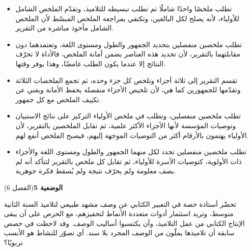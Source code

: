 \documentclass[11pt,a4paper]{article}
\begin{document}
\begin{itemize}[leftmargin=1.0cm, labelsep=6pt, itemsep=3pt, topsep=4pt, parsep=0pt]
  \item[\textbf{أ)}] تطلب ملخصًا واحدًا شاملًا ثم تطلب تبسيطه للتلاميذ، وتقدّم الملخص الشامل للأولياء، لأنه يصلح لكل البالغين، وتكتفي بمراجعة الملخص المبسّط لأن الملخص الشامل مأخوذ مباشرة من التقرير.
  \item[\textbf{ب)}] تطلب ملخصين منفصلين بتحديد الجمهور والطول ومستوى اللغة، وتعتمدهما دون مقابلتهما بالتقرير، لأن تحديد هذه العناصر يضمن أمانة الملخص، فالأداة لا تحرّف النتائج إلا عندما يكون الطلب غامضًا، وهذا يوفر وقتها.
  \item[\textbf{ج)}] تقسم التقرير إلى ثلاثة أجزاء وتلخص كل جزء وحده، ثم تجمع الملخصات الثلاثة وتقدّمها للجمهورين كما هي، لأن تلخيص الأجزاء منفصلة يحفظ الأمانة ويغني عن تكييف الملخص مع كل جمهور.
  \item[\textbf{د)}] تطلب ملخصين منفصلين، وتطلب في ملخص الأولياء التركيز على نتائج الاستبيان وتوصيات المؤسسة لأنها الأجزاء الأكثر علمية، ثم تقابل الملخصين بالتقرير، لأن الأولياء يهتمون بالأرقام أكثر من التوصيات الموجهة إليهم، فيصبح الملخص أنفع لهم.
  \item[\textbf{هـ)}] تطلب ملخصين منفصلين تحدد لكل منهما الجمهور والطول ومستوى اللغة والأجزاء ذات الأولوية، كتوصيات الأسرة للأولياء، ثم تقابل كل ملخص بالتقرير لتتأكد أنه لم يضف معلومة ولم يحرّف نتيجة ولم يُسقط فكرة جوهرية.
\end{itemize}
\par\vspace{6pt}
\noindent
{\large\khatt\textbf{الوضعية 5}}\hfill{\small(الفصل 6)}\par\nopagebreak\vspace{3pt}
\setlength{\fboxsep}{7pt}\colorbox{gray!10}{\parbox{\dimexpr\linewidth-14pt}{تحضّر أستاذة حصة في التعبير الكتابي عن وصف مشهد طبيعي لتلاميذ السنة الثانية متوسط، وتريد استثمار أدوات متعددة الأنماط لتحفيزهم، مع الحرص على أن يبقى الإنتاج الكتابي من عمل التلاميذ، وأن يكتسبوا أساليب الوصف. وقد لاحظت في حصص سابقة أن تلاميذها يملّون من الوصف المجرد بلا سند. أي تصوّر للنشاط هو الأنسب تربويًا؟}}\par\nopagebreak
\end{document}
